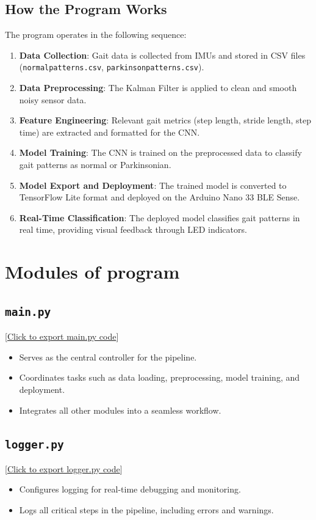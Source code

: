 \subsection{How the Program Works}

The program operates in the following sequence:
\begin{enumerate}
    \item \textbf{Data Collection}: Gait data is collected from IMUs and stored in CSV files (\texttt{normalpatterns.csv}, \texttt{parkinsonpatterns.csv}).
    \item \textbf{Data Preprocessing}: The Kalman Filter is applied to clean and smooth noisy sensor data.
    \item \textbf{Feature Engineering}: Relevant gait metrics (step length, stride length, step time) are extracted and formatted for the CNN.
    \item \textbf{Model Training}: The CNN is trained on the preprocessed data to classify gait patterns as normal or Parkinsonian.
    \item \textbf{Model Export and Deployment}: The trained model is converted to TensorFlow Lite format and deployed on the Arduino Nano 33 BLE Sense.
    \item \textbf{Real-Time Classification}: The deployed model classifies gait patterns in real time, providing visual feedback through LED indicators.
\end{enumerate}

\section{Modules of program}

\subsection{\texttt{main.py}}
[\href{run:../Code/MicroPython/project code/main.py}{Click to export main.py code}] 
\begin{itemize}
    \item Serves as the central controller for the pipeline.
    \item Coordinates tasks such as data loading, preprocessing, model training, and deployment.
    \item Integrates all other modules into a seamless workflow.
\end{itemize}

\subsection{\texttt{logger.py}}
[\href{run:../Code/MicroPython/project code/src/logger.py}{Click to export logger.py code}] 
\begin{itemize}
    \item Configures logging for real-time debugging and monitoring.
    \item Logs all critical steps in the pipeline, including errors and warnings.
\end{itemize}

